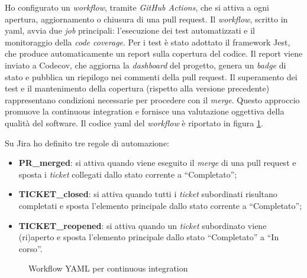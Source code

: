 Ho configurato un \textit{workflow}, tramite \textit{GitHub Actions}, che si attiva a ogni apertura, aggiornamento o chiusura di una \gls{pull request}. Il \textit{workflow}, scritto in \gls{yaml}, avvia due \textit{job} principali: l’esecuzione dei test automatizzati e il monitoraggio della \textit{code coverage}. Per i test è stato adottato il \gls{framework} Jest, che produce automaticamente un report sulla copertura del codice. Il report viene inviato a Codecov, che aggiorna la \textit{dashboard} del progetto, genera un \textit{badge} di stato e pubblica un riepilogo nei commenti della \gls{pull request}. Il superamento dei test e il mantenimento della copertura (rispetto alla versione precedente) rappresentano condizioni necessarie per procedere con il \textit{merge}. Questo approccio promuove la \gls{continuous integration} e fornisce una valutazione oggettiva della qualità del software. Il codice \gls{yaml} del \textit{workflow} è riportato in figura \ref{fig:workflow_yaml}.

\vspace{10pt}
\noindent Su Jira ho definito tre regole di automazione:
\begin{itemize}
  \item \textbf{PR\_merged}: si attiva quando viene eseguito il \textit{merge} di una \gls{pull request} e sposta i \textit{ticket} collegati dallo stato corrente a “Completato”;
  \item \textbf{TICKET\_closed}: si attiva quando tutti i \textit{ticket} subordinati risultano completati e sposta l'elemento principale dallo stato corrente a “Completato”;
  \item \textbf{TICKET\_reopened}: si attiva quando un \textit{ticket} subordinato viene (ri)aperto e sposta l’elemento principale dallo stato “Completato” a “In corso”.
\end{itemize}

\begin{figure}[H] 
  \centering 
  \caption{Workflow YAML per continuous integration}
  \label{fig:workflow_yaml}
\end{figure}